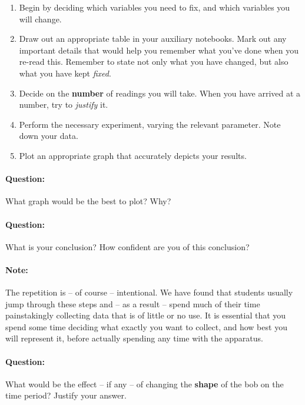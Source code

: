 \begin{enumerate}
    \item Begin by deciding which variables you need to fix, and which variables you will change.
    
    \item Draw out an appropriate table in your auxiliary notebooks. Mark out any important details that would help you remember what you've done when you re-read this. Remember to state not only what you have changed, but also what you have kept \textit{fixed}.
    
    \item Decide on the \textbf{number} of readings you will take. When you have arrived at a number, try to \textit{justify} it.
    
    \item Perform the necessary experiment, varying the relevant parameter. Note down your data.
    
    \item Plot an appropriate graph that accurately depicts your results.
\end{enumerate}


\begin{question}
\paragraph{Question:} What graph would be the best to plot? Why? ~\\

\paragraph{Question:} What is your conclusion? How confident are you of this conclusion?
\end{question}

\paragraph{Note:} The repetition is -- of course -- intentional. We have found that students usually jump through these steps and -- as a result -- spend much of their time painstakingly collecting data that is of little or no use. It is essential that you spend some time deciding what exactly you want to collect, and how best you will represent it, before actually spending any time with the apparatus.


\begin{question}
\paragraph{Question:} What would be the effect -- if any -- of changing the \textbf{shape} of the bob on the time period? Justify your answer.
\end{question} 






\newpage